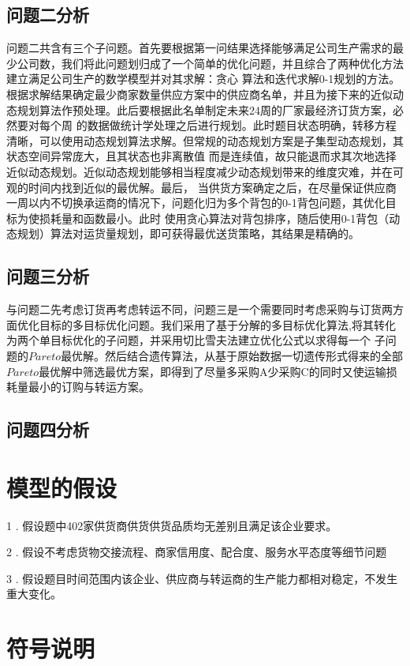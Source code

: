 \documentclass{cumcmthesis}
\begin{document}
\subsection{问题二分析}
问题二共含有三个子问题。首先要根据第一问结果选择能够满足公司生产需求的最少公司数，我们将此问题划归成了一个简单的优化问题，并且综合了两种优化方法建立满足公司生产的数学模型并对其求解：贪心
算法和迭代求解0-1规划的方法。根据求解结果确定最少商家数量供应方案中的供应商名单，并且为接下来的近似动态规划算法作预处理。此后要根据此名单制定未来24周的厂家最经济订货方案，必然要对每个周
的数据做统计学处理之后进行规划。此时题目状态明确，转移方程清晰，可以使用动态规划算法求解。但常规的动态规划方案是子集型动态规划，其状态空间异常庞大，且其状态也非离散值
而是连续值，故只能退而求其次地选择近似动态规划。近似动态规划能够相当程度减少动态规划带来的维度灾难，并在可观的时间内找到近似的最优解。最后，
当供货方案确定之后，在尽量保证供应商一周以内不切换承运商的情况下，问题化归为多个背包的0-1背包问题，其优化目标为使损耗量和函数最小。此时
使用贪心算法对背包排序，随后使用0-1背包（动态规划）算法对运货量规划，即可获得最优送货策略，其结果是精确的。

\subsection{问题三分析}
与问题二先考虑订货再考虑转运不同，问题三是一个需要同时考虑采购与订货两方面优化目标的多目标优化问题。我们采用了基于分解的多目标优化算法\cite{3},将其转化为两个单目标优化的子问题，并采用切比雪夫法建立优化公式以求得每一个
子问题的$Pareto$最优解。然后结合遗传算法，从基于原始数据一切遗传形式得来的全部$Pareto$最优解中筛选最优方案，即得到了尽量多采购A少采购C的同时又使运输损耗量最小的订购与转运方案。
\subsection{问题四分析}

\section{模型的假设}
1 . 假设题中402家供货商供货供货品质均无差别且满足该企业要求。

2 . 假设不考虑货物交接流程、商家信用度、配合度、服务水平态度等细节问题

3 . 假设题目时间范围内该企业、供应商与转运商的生产能力都相对稳定，不发生重大变化。

\section{符号说明}
\end{document}
